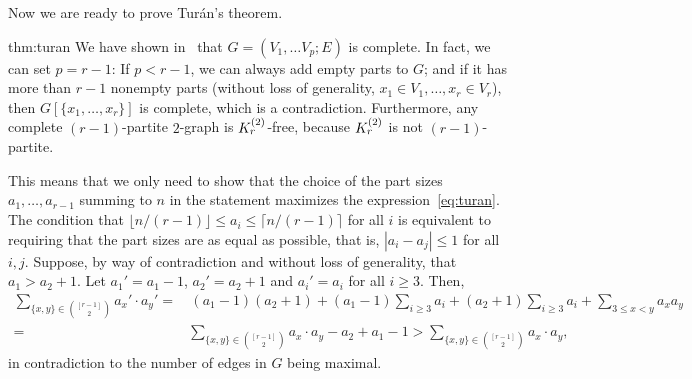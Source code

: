 Now we are ready to prove Turán's theorem.
\begin{delayedproof}{thm:turan}
    We have shown in~ that $G = (V_1, \dots V_p; E)$ is complete.
    In fact, we can set $p = r - 1$:
    If $p < r - 1$, we can always add empty parts to $G$; and if it has more than $r - 1$ nonempty parts
    (without loss of generality, $x_1 \in V_1, \dots, x_r \in V_r$), then $G[\{x_1, \dots, x_r\}]$ is complete,
    which is a contradiction.
    Furthermore, any complete $(r-1)$-partite $2$-graph is $K^{(2)}_{r}$-free,
    because $K^{(2)}_{r}$ is not $(r-1)$-partite.

    This means that we only need to show that the choice of the part sizes $a_1, \dots, a_{r-1}$ summing to $n$
    in the statement maximizes the expression~\eqref{eq:turan}.
    The condition that $\lfloor n / (r-1) \rfloor \leq a_i \leq \lceil n / (r-1) \rceil$ for all $i$
    is equivalent to requiring that the part sizes are as equal as possible, that is,
    $|a_i - a_j| \leq 1$ for all $i, j$.
    Suppose, by way of contradiction and without loss of generality, that $a_1 > a_2 + 1$.
    Let $a_1' = a_1 - 1$, $a_2' = a_2 + 1$ and $a_i' = a_i$ for all $i \geq 3$.
    Then,
    \begin{align*}
        \sum_{\{x, y\} \in \binom{[r-1]}{2}} a_x' \cdot a_y'
        =& \, (a_1 - 1)(a_2 + 1) + (a_1 - 1) \sum_{i \geq 3} a_i + (a_2 + 1) \sum_{i \geq 3} a_i + \sum_{3 \leq x < y} a_x a_y \\
        =& \sum_{\{x, y\} \in \binom{[r-1]}{2}} a_x \cdot a_y - a_2 + a_1 - 1
        > \sum_{\{x, y\} \in \binom{[r-1]}{2}} a_x \cdot a_y,
    \end{align*}
    in contradiction to the number of edges in $G$ being maximal.
\end{delayedproof}

